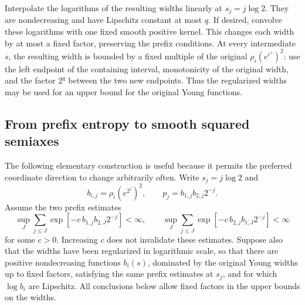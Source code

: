 \documentclass[11pt]{article}
\numberwithin{equation}{section}
\begin{document}
Interpolate the logarithms of the resulting widths linearly at
$s_j=j\log2$. They are nondecreasing and have Lipschitz constant at most
$q$. If desired, convolve these logarithms with one fixed smooth positive
kernel. This changes each width by at most a fixed factor, preserving
the prefix conditions. At every intermediate $s$, the resulting width
is bounded by a fixed multiple of the original
$\rho_i(e^{e^s})^2$: use the left endpoint of the containing interval,
monotonicity of the original width, and the factor $2^q$ between the two
new endpoints. Thus the regularized widths may be used for an upper
bound for the original Young functions.



\subsection{From prefix entropy to smooth squared semiaxes}
\label{pair:sec:entropy-path}

The following elementary construction is useful because it permits the
preferred coordinate direction to change arbitrarily often.
Write $s_j=j\log2$ and
\[
 b_{i,j}=\rho_i(e^{2^j})^2,\qquad
 p_j=b_{1,j}b_{2,j}2^{-j}.
\]
Assume the two prefix estimates
\begin{equation}\label{pair:eq:prefix-for-path}
 \sup_J\sum_{j\le J}
 \exp[-c\,b_{1,j}b_{2,J}2^{-j}]<\infty,
 \qquad
 \sup_J\sum_{j\le J}
 \exp[-c\,b_{2,j}b_{1,J}2^{-j}]<\infty
\end{equation}
for some $c>0$. Increasing $c$ does not invalidate these estimates.
Suppose also that the widths have been regularized in logarithmic scale,
so that there are positive nondecreasing functions $b_i(s)$, dominated by the original Young widths up to fixed factors, satisfying
the same prefix estimates at $s_j$, and for which
$\log b_i$ are Lipschitz. All conclusions below allow fixed factors in
the upper bounds on the widths.
\end{document}
